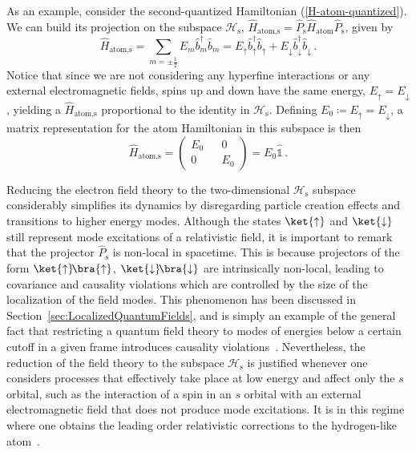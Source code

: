 \documentclass[letterpaper,12pt,titlepage,oneside,final]{book}
\begin{document}
As an example, consider the second-quantized Hamiltonian (\ref{H-atom-quantized}). We can build its projection on the subspace $\mathscr{H}_\text{s}$, \mbox{$\hat{H}_{\text{atom,}\text{s}}=\hat{P}_\text{s} \hat{H}_{\text{atom}}\hat{P}_\text{s}$}, given by
\begin{equation}\label{H-atom-lzero}
    \hat{H}_{\text{atom,}\text{s}} = \sum_{m = \pm \frac{1}{2}} E_{m}\hat{b}_{m}^\dagger\hat{b}_m = E_{\uparrow}\hat{b}_{\uparrow}^\dagger\hat{b}_\uparrow + E_{\downarrow}\hat{b}_{\downarrow}^\dagger\hat{b}_\downarrow \,.
\end{equation}
Notice that since we are not considering any hyperfine interactions or any external electromagnetic fields, spins up and down have the same energy, $E_{\uparrow} = E_\downarrow$, yielding a $\hat{H}_{\text{atom,}\text{s}}$ proportional to the identity in $\mathscr{H}_\text{s}$. Defining $E_0 \coloneqq E_{\uparrow} = E_\downarrow$, a matrix representation for the atom Hamiltonian in this subspace is then 
\begin{equation}
    \hat{H}_{\text{atom,}\text{s}} = \begin{pmatrix}
        E_0&&0\\0&&E_0
    \end{pmatrix} = E_0\hat{\mathds{1}} \, .
\end{equation}

Reducing the electron field theory to the two-dimensional $\mathscr{H}_\text{s}$ subspace considerably simplifies its dynamics by disregarding particle creation effects and transitions to higher energy modes. Although the states $\ket{\uparrow}$ and $\ket{\downarrow}$ still represent mode excitations of a relativistic field, it is important to remark that the projector $\hat{P}_\text{s}$ is non-local in spacetime. This is because projectors of the form $\ket{\uparrow}\!\bra{\uparrow}$, $\ket{\downarrow}\!\bra{\downarrow}$ are intrinsically non-local, leading to covariance and causality violations which are controlled by the size of the localization of the field modes. This phenomenon has been discussed in Section~\ref{sec:LocalizedQuantumFields}, and is simply an example of the general fact that restricting a quantum field theory to modes of energies below a certain cutoff in a given frame introduces causality violations~\cite{polchinski1999effective, BurgessEffectiveFieldTheory,Bruno}. Nevertheless, the reduction of the field theory to the subspace $\mathscr{H}_\text{s}$ is justified whenever one considers processes that effectively take place at low energy and affect only the $s$ orbital, such as the interaction of a spin in an $s$ orbital with an external electromagnetic field that does not produce mode excitations. It is in this regime where one obtains the leading order relativistic corrections to the hydrogen-like atom~\cite{Dirac-electron-theory,RQMgreiner}.
\end{document}
